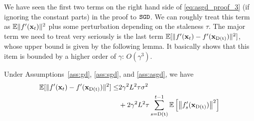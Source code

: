 We have seen the first two terms on the right hand side of \eqref{eq:asgd_proof_3} (if ignoring the constant parts) in the proof to $\texttt{SGD}$. %
We can roughly treat this term as $\mathbb{E}\|f'({\bf x}_{t})\|^2$ plus some perturbation depending on the staleness $\tau$. The major term we need to treat very seriously is the last term $\mathbb{E}[\|f'({\bf x}_t) - f'({\bf x}_{\rm D(t)})\|^2]$, whose upper bound is given by the following lemma. It basically shows that this item is bounded by a higher order of $\gamma$: $O(\gamma^3)$.
\begin{tcolorbox}[colback=yellow!5!white,colframe=black!75!black]
\begin{lemma}\label{lem:asgd_1}
Under Assumptions~\ref{ass:gd}, \ref{ass:sgd}, and \ref{ass:asgd}, we have
\begin{align*}
\mathbb{E}[\|f'({\bf x}_t) - f'({\bf x}_{\rm D(t)})\|^2] \leq & 2\gamma^2L^2 \tau \sigma^2 
\\ &
+  2\gamma^2L^2 \tau \sum_{s=\rm D(t)}^{t-1} \mathbb{E}\left[ \left\| f'_s({\bf x}_{\rm D(t)}) \right\|^2 \right]
\end{align*}
\end{lemma} 
\end{tcolorbox}

